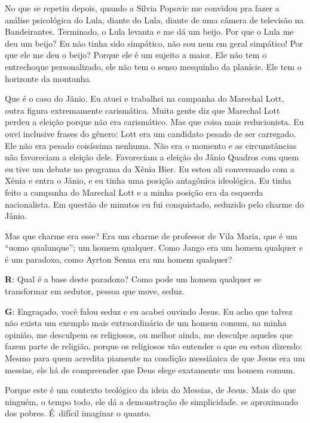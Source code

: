  

No que se repetiu depois, quando a Silvia Popovic me convidou pra fazer
a análise psicológica do Lula, diante do Lula, diante de uma câmera de
televisão na  Bandeirantes. Terminado, o Lula levanta e me dá um
beijo. Por que o Lula me deu um beijo? Eu não tinha sido simpático, não
sou nem em geral simpático! Por que ele me deu o beijo? Porque ele é um
sujeito a maior. Ele não tem o entrechoque personalizado, ele não tem o
senso mesquinho da planície. Ele tem o horizonte da montanha.

 

Que é o caso do Jânio. Eu atuei e trabalhei na campanha do Marechal
Lott, outra figura extremamente carismática. Muita gente diz que
Marechal Lott perdeu a eleição porque não era carismático. Mas que coisa
mais reducionista. Eu ouvi inclusive frases do gênero: Lott era um
candidato pesado de ser carregado. Ele não era pesado coisíssima
nenhuma. Não era o momento e as circunstâncias não favoreciam a eleição
dele. Favoreciam a eleição do Jânio Quadros com quem eu tive um debate
no programa da Xênia Bier. Eu estou ali conversando com a Xênia e entra
o Jânio, e eu tinha uma posição antagônica ideológica. Eu tinha feito a
campanha do Marechal Lott e a minha posição era da esquerda
nacionalista. Em questão de minutos eu fui conquistado, seduzido pelo
charme do Jânio.

 

Mas que charme era esse? Era um charme de professor de Vila Maria, que é
um ``uomo qualunque''; um homem qualquer. Como Jango era um homem
qualquer e é um paradoxo, como Ayrton Senna era um homem qualquer?

 

\textbf{R}: Qual é a base deste paradoxo? Como pode um homem qualquer se
transformar em sedutor, pessoa que move, seduz.

 

\textbf{G}: Engraçado, você falou seduz e eu acabei ouvindo Jesus. Eu
acho que talvez não exista um exemplo mais extraordinário de um homem
comum, na minha opinião, me desculpem os religiosos, ou melhor ainda, me
desculpe aqueles que fazem parte de religião, porque os religiosos vão
entender o que eu estou dizendo: Mesmo para quem acredita piamente na
condição messiânica de que Jesus era um messias, ele há de compreender
que Deus elege exatamente um homem comum.

Porque este é um contexto teológico da ideia do Messias, de Jesus. Mais
do que ninguém, o tempo todo, ele dá a demonstração de simplicidade. se
aproximando dos pobres. É~difícil imaginar o quanto.

